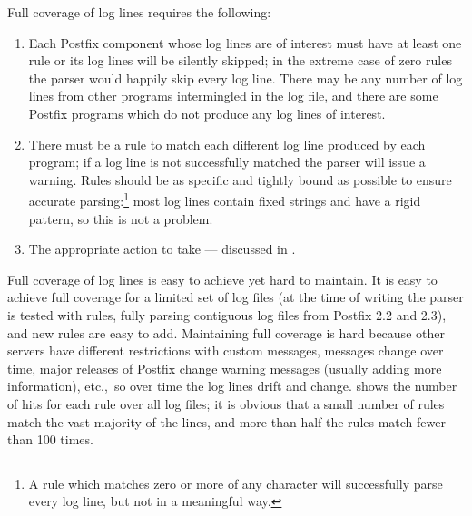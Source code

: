 Full coverage of log lines requires the following:

\begin{enumerate}

    \item Each Postfix component whose log lines are of interest must have
        at least one rule or its log lines will be silently skipped; in the
        extreme case of zero rules the parser would happily skip every log
        line.  There may be any number of log lines from other programs
        intermingled in the log file, and there are some Postfix programs
        which do not produce any log lines of interest.

    \item There must be a rule to match each different log line produced by
        each program; if a log line is not successfully matched the parser
        will issue a warning.  Rules should be as specific and tightly
        bound as possible to ensure accurate parsing:\footnote{A rule which
        matches zero or more of any character will successfully parse every
        log line, but not in a meaningful way.} most log lines contain
        fixed strings and have a rigid pattern, so this is not a problem.

    \item The appropriate action to take --- discussed in
        .

\end{enumerate}

Full coverage of log lines is easy to achieve yet hard to maintain.  It is
easy to achieve full coverage for a limited set of log files (at the time
of writing the parser is tested with \numberOFrules{} rules, fully parsing
\numberOFlogFILES{} contiguous log files from Postfix 2.2 and 2.3), and new
rules are easy to add.  Maintaining full coverage is hard because other
servers have different restrictions with custom messages, \DNSBL{} messages
change over time, major releases of Postfix change warning messages
(usually adding more information), etc.,\ so over time the log lines drift
and change.   shows the number of hits
for each rule over all \numberOFlogFILES{} log files; it is obvious that a
small number of rules match the vast majority of the lines, and more than
half the rules match fewer than 100 times.

